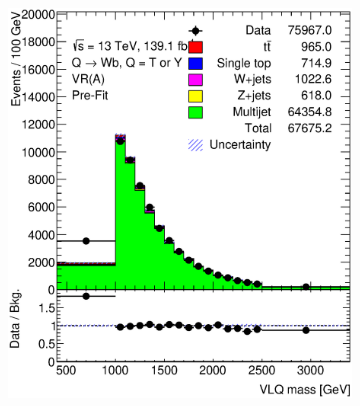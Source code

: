 \begin{figure}[hbt!]
	\centering
	\begin{subfigure}{.35\textwidth}
		\centering
		\includegraphics[width=\linewidth,height=\textheight,keepaspectratio]{figs/chapter5/prefitintegral/VR_B_VLQM.eps}
		\caption{}
		\label{fig:abcd:correctionfactor:integral:VLQM}
	\end{subfigure}\hspace{0.6cm}
	\begin{subfigure}{.35\textwidth}
		\centering

\end{subfigure}
\end{figure}
